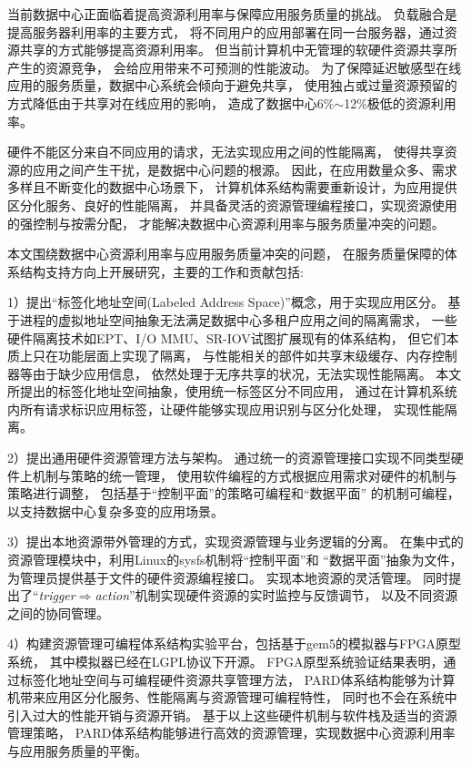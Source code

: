\begin{cabstract}
  当前数据中心正面临着提高资源利用率与保障应用服务质量的挑战。
  负载融合是提高服务器利用率的主要方式，
  将不同用户的应用部署在同一台服务器，通过资源共享的方式能够提高资源利用率。
  但当前计算机中无管理的软硬件资源共享所产生的资源竞争，
  会给应用带来不可预测的性能波动。
  为了保障延迟敏感型在线应用的服务质量，数据中心系统会倾向于避免共享，
  使用独占或过量资源预留的方式降低由于共享对在线应用的影响，
  造成了数据中心6\%$\sim$12\%极低的资源利用率。

  硬件不能区分来自不同应用的请求，无法实现应用之间的性能隔离，
  使得共享资源的应用之间产生干扰，是数据中心问题的根源。
  因此，在应用数量众多、需求多样且不断变化的数据中心场景下，
  计算机体系结构需要重新设计，为应用提供区分化服务、良好的性能隔离，
  并具备灵活的资源管理编程接口，实现资源使用的强控制与按需分配，
  才能解决数据中心资源利用率与服务质量冲突的问题。

  本文围绕数据中心资源利用率与应用服务质量冲突的问题，
  在服务质量保障的体系结构支持方向上开展研究，主要的工作和贡献包括:

  1）提出``标签化地址空间(Labeled Address Space)''概念，用于实现应用区分。
     基于进程的虚拟地址空间抽象无法满足数据中心多租户应用之间的隔离需求，
     一些硬件隔离技术如EPT、I/O MMU、SR-IOV试图扩展现有的体系结构，
     但它们本质上只在功能层面上实现了隔离，
     与性能相关的部件如共享末级缓存、内存控制器等由于缺少应用信息，
     依然处理于无序共享的状况，无法实现性能隔离。
     本文所提出的标签化地址空间抽象，使用统一标签区分不同应用，
     通过在计算机系统内所有请求标识应用标签，让硬件能够实现应用识别与区分化处理，
     实现性能隔离。

  2）提出通用硬件资源管理方法与架构。
     通过统一的资源管理接口实现不同类型硬件上机制与策略的统一管理，
     使用软件编程的方式根据应用需求对硬件的机制与策略进行调整，
     包括基于``控制平面''的策略可编程和``数据平面'' 的机制可编程，
     以支持数据中心复杂多变的应用场景。

  3）提出本地资源带外管理的方式，实现资源管理与业务逻辑的分离。
     在集中式的资源管理模块中，利用Linux的sysfs机制将``控制平面''和
     ``数据平面''抽象为文件，为管理员提供基于文件的硬件资源编程接口。
     实现本地资源的灵活管理。
     同时提出了``\emph{trigger$\Rightarrow$action}''机制实现硬件资源的实时监控与反馈调节，
     以及不同资源之间的协同管理。

  4）构建资源管理可编程体系结构实验平台，包括基于gem5的模拟器与FPGA原型系统，
     其中模拟器已经在LGPL协议下开源。
     FPGA原型系统验证结果表明，通过标签化地址空间与可编程硬件资源共享管理方法，
     PARD体系结构能够为计算机带来应用区分化服务、性能隔离与资源管理可编程特性，
     同时也不会在系统中引入过大的性能开销与资源开销。
     基于以上这些硬件机制与软件栈及适当的资源管理策略，
     PARD体系结构能够进行高效的资源管理，实现数据中心资源利用率与应用服务质量的平衡。
\end{cabstract}

